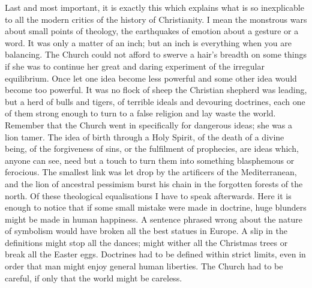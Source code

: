 \documentclass{book}
\begin{document}
Last and most important, it is exactly this which explains what is so inexplicable to all the modern critics of the history of Christianity. I mean the monstrous wars about small points of theology, the earthquakes of emotion about a gesture or a word. It was only a matter of an inch; but an inch is everything when you are balancing. The Church could not afford to swerve a hair’s breadth on some things if she was to continue her great and daring experiment of the irregular equilibrium. Once let one idea become less powerful and some other idea would become too powerful. It was no flock of sheep the Christian shepherd was leading, but a herd of bulls and tigers, of terrible ideals and devouring doctrines, each one of them strong enough to turn to a false religion and lay waste the world. Remember that the Church went in specifically for dangerous ideas; she was a lion tamer. The idea of birth through a Holy Spirit, of the death of a divine being, of the forgiveness of sins, or the fulfilment of prophecies, are ideas which, anyone can see, need but a touch to turn them into something blasphemous or ferocious. The smallest link was let drop by the artificers of the Mediterranean, and the lion of ancestral pessimism burst his chain in the forgotten forests of the north. Of these theological equalisations I have to speak afterwards. Here it is enough to notice that if some small mistake were made in doctrine, huge blunders might be made in human happiness. A sentence phrased wrong about the nature of symbolism would have broken all the best statues in Europe. A slip in the definitions might stop all the dances; might wither all the Christmas trees or break all the Easter eggs. Doctrines had to be defined within strict limits, even in order that man might enjoy general human liberties. The Church had to be careful, if only that the world might be careless.
\end{document}
